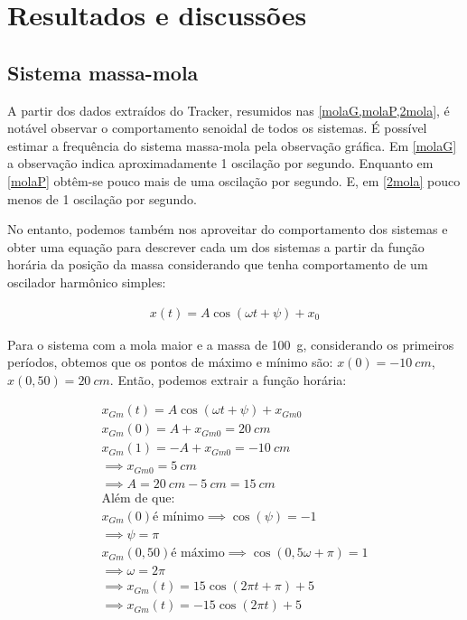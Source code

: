 \section{Resultados e discussões}
\subsection{Sistema massa-mola}
A partir dos dados extraídos do Tracker, resumidos nas \cref{molaG,molaP,2mola}, é notável observar o comportamento senoidal de todos os sistemas. É possível estimar a frequência do sistema massa-mola pela observação gráfica. Em \cref{molaG} a observação indica aproximadamente 1 oscilação por segundo. Enquanto em \cref{molaP} obtêm-se pouco mais de uma oscilação por segundo. E, em \cref{2mola} pouco menos de 1 oscilação por segundo.

No entanto, podemos também nos aproveitar do comportamento dos sistemas e obter uma equação para descrever cada um dos sistemas a partir da função horária da posição da massa considerando que tenha comportamento de um oscilador harmônico simples: 

\begin{align*}
    x(t) = A\cos(\omega t + \psi) + x_0
\end{align*}

Para o sistema com a mola maior e a massa de \qty{100}{\gram}, considerando os primeiros períodos, obtemos que os pontos de máximo e mínimo são: \(x(0) = \qty{-10}{cm}\), \(x(0,50) = \qty{20}{cm}\). Então, podemos extrair a função horária:

\begin{align*}
    x_{Gm}(t) = A\cos(\omega t + \psi) + x_{Gm0}\\
    x_{Gm}(0) = A + x_{Gm0} = \qty{20}{cm} \\
    x_{Gm}(1) = -A + x_{Gm0} = \qty{-10}{cm} \\
    \implies x_{Gm0} = \qty{5}{cm}\\
    \implies A = \qty{20}{cm} - \qty{5}{cm} = \qty{15}{cm}\\
    \text{Além de que:}\\
    x_{Gm}(0) \text{é mínimo} \implies \cos(\psi) = -1\\
    \implies \psi = \pi\\
    x_{Gm}(0,50) \text{é máximo} \implies \cos(0,5\omega + \pi) = 1\\
    \implies \omega = 2 \pi\\
    \implies x_{Gm}(t) = 15\cos(2\pi t + \pi) + 5\\
    \implies x_{Gm}(t) = -15\cos(2\pi t) + 5
\end{align*}


